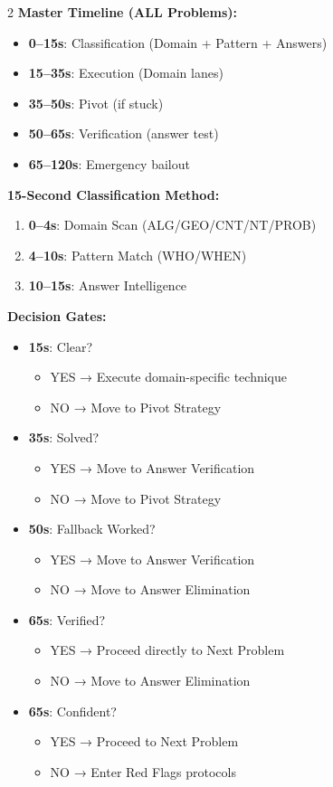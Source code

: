 \documentclass{article}
\begin{document}
\begin{tcolorbox}[colback=blue!5!white,colframe=blue!75!black,title={\textbf{Competition Day Quick Reference}}]
\begin{multicols}{2}
\textbf{Master Timeline (ALL Problems):}
\begin{itemize}[nosep]
\item \textbf{0--15s}: Classification (Domain + Pattern + Answers)
\item \textbf{15--35s}: Execution (Domain lanes)
\item \textbf{35--50s}: Pivot (if stuck)
\item \textbf{50--65s}: Verification (answer test)
\item \textbf{65--120s}: Emergency bailout
\end{itemize}

\textbf{15-Second Classification Method:}
\begin{enumerate}[nosep]
\item \textbf{0--4s}: Domain Scan (ALG/GEO/CNT/NT/PROB)
\item \textbf{4--10s}: Pattern Match (WHO/WHEN)
\item \textbf{10--15s}: Answer Intelligence
\end{enumerate}

\textbf{Decision Gates:}
\begin{itemize}[nosep]
\item \textbf{15s}: Clear? 
 \begin{itemize}[nosep]
     \item YES → Execute domain-specific technique
     \item NO → Move to Pivot Strategy
 \end{itemize}
\item \textbf{35s}: Solved? 
   \begin{itemize}[nosep]
   \item YES → Move to Answer Verification
   \item NO → Move to Pivot Strategy
   \end{itemize}
\item \textbf{50s}: Fallback Worked? 
   \begin{itemize}[nosep]
   \item YES → Move to Answer Verification
   \item NO → Move to Answer Elimination
   \end{itemize}
\item \textbf{65s}: Verified? 
   \begin{itemize}[nosep]
   \item YES → Proceed directly to Next Problem
   \item NO → Move to Answer Elimination
   \end{itemize}
\item \textbf{65s}: Confident? 
   \begin{itemize}[nosep]
   \item YES → Proceed to Next Problem
   \item NO → Enter Red Flags protocols
   \end{itemize}
\end{itemize}


\end{multicols}
\end{tcolorbox}
\end{document}
